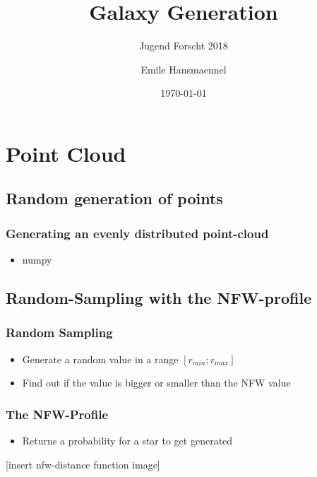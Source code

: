 \documentclass[aspectratio=169]{beamer}
\title{Galaxy Generation}
\subtitle{Jugend Forscht 2018}
\author{Emile Hansmaennel}
\institute{Theodor Fliedner Gymnasium}
\date{\today}
\begin{document}
  \begin{frame}
    \titlepage
  \end{frame}

  \begin{frame}
    \tableofcontents
  \end{frame}

  \section{Point Cloud}
  \subsection{Random generation of points}

  \begin{frame}
    \frametitle{Generating an evenly distributed point-cloud}

    \begin{itemize}
      \item numpy
    \end{itemize}

  \end{frame}

  \subsection{Random-Sampling with the NFW-profile}

  \begin{frame}
    \frametitle{Random Sampling}

    \begin{itemize}
      \item Generate a random value in a range \( [r_{min};r_{max}] \)
      \item Find out if the value is bigger or smaller than the NFW value
    \end{itemize}

  \end{frame}

  \begin{frame}
    \frametitle{The NFW-Profile}

    \begin{itemize}
      \item Returns a probability for a star to get generated
    \end{itemize}

    [insert nfw-distance function image]
  \end{frame}
\end{document}

